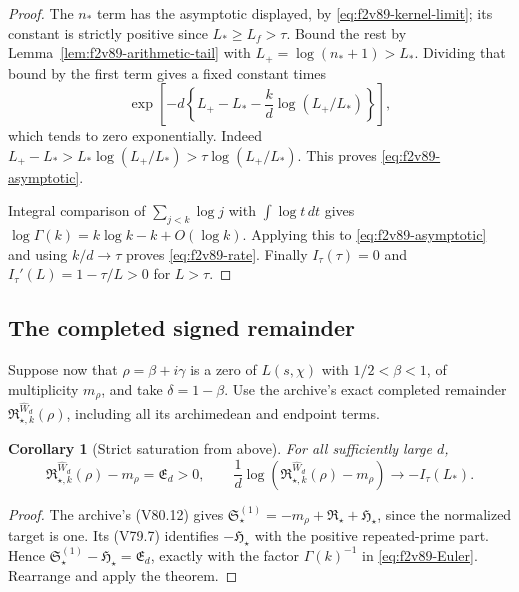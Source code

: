 \documentclass[11pt]{article}
\newtheorem{corollary}[theorem]{Corollary}
\theoremstyle{definition}
\theoremstyle{remark}
\begin{document}
\begin{proof}
The \(n_*\) term has the asymptotic displayed, by
\eqref{eq:f2v89-kernel-limit}; its constant is strictly positive since
\(L_*\ge L_f>\tau\).  Bound the rest by
Lemma~\ref{lem:f2v89-arithmetic-tail} with
\(L_+=\log(n_*+1)>L_*\).  Dividing that bound by the first term gives
a fixed constant times
\[
 \exp\left[-d\left\{L_+-L_*
                 -\frac{k}{d}\log(L_+/L_*)\right\}\right],
\]
which tends to zero exponentially.  Indeed
\(L_+-L_* > L_*\log(L_+/L_*)>\tau\log(L_+/L_*)\).
This proves \eqref{eq:f2v89-asymptotic}.

Integral comparison of \(\sum_{j<k}\log j\) with \(\int\log t\,dt\)
gives \(\log\Gamma(k)=k\log k-k+O(\log k)\).  Applying this to
\eqref{eq:f2v89-asymptotic} and using \(k/d\to\tau\) proves
\eqref{eq:f2v89-rate}.  Finally \(I_\tau(\tau)=0\) and
\(I_\tau'(L)=1-\tau/L>0\) for \(L>\tau\).
\end{proof}

\subsection{The completed signed remainder}

Suppose now that \(\rho=\beta+i\gamma\) is a zero of \(L(s,\chi)\)
with \(1/2<\beta<1\), of multiplicity \(m_\rho\), and take
\(\delta=1-\beta\).  Use the archive's exact completed remainder
\(\mathfrak R_{\star,k}^{\widehat W_d}(\rho)\), including all its
archimedean and endpoint terms.

\begin{corollary}[Strict saturation from above]
\label{cor:f2v89-saturation}
For all sufficiently large \(d\),
\begin{equation}
 \mathfrak R_{\star,k}^{\widehat W_d}(\rho)-m_\rho
 =\mathfrak E_d>0,
 \qquad
 \frac1d\log\left(
 \mathfrak R_{\star,k}^{\widehat W_d}(\rho)-m_\rho\right)
 \longrightarrow-I_\tau(L_*).
 \label{eq:f2v89-saturation}
\end{equation}
\end{corollary}

\begin{proof}
The archive's (V80.12) gives
\(\mathfrak S_\star^{(1)}=-m_\rho+\mathfrak R_\star+\mathfrak H_\star\),
since the normalized target is one.  Its (V79.7) identifies
\(-\mathfrak H_\star\) with the positive repeated-prime part.  Hence
\(\mathfrak S_\star^{(1)}-\mathfrak H_\star=\mathfrak E_d\), exactly
with the factor \(\Gamma(k)^{-1}\) in \eqref{eq:f2v89-Euler}.
Rearrange and apply the theorem.
\end{proof}
\end{document}
